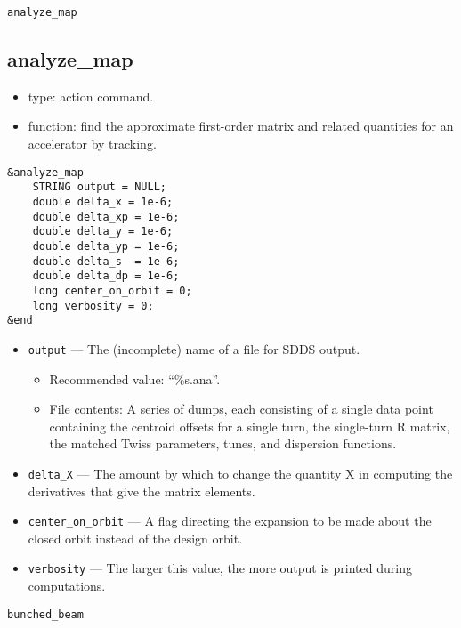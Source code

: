 \documentclass[11pt]{article}
\begin{document}
\begin{latexonly}
\newpage
\begin{center}{\Large \verb|analyze_map|}\end{center}
\end{latexonly}
\subsection{analyze\_map}

\begin{itemize}
\item type: action command.
\item function: find the approximate first-order matrix and related quantities for an accelerator by tracking.
\end{itemize}

\begin{verbatim}
&analyze_map
    STRING output = NULL;
    double delta_x = 1e-6;
    double delta_xp = 1e-6;
    double delta_y = 1e-6;
    double delta_yp = 1e-6;
    double delta_s  = 1e-6;
    double delta_dp = 1e-6;
    long center_on_orbit = 0;
    long verbosity = 0;
&end
\end{verbatim}

\begin{itemize}
\item \verb|output| --- The (incomplete) name of a file for SDDS output.
    \begin{itemize}
    \item Recommended value: ``\%s.ana''.
    \item File contents:  A series of dumps, each consisting of a single data point containing
        the centroid offsets for a single turn, the single-turn R matrix, the matched Twiss parameters, tunes, and 
        dispersion functions.
    \end{itemize}
\item \verb|delta_X| --- The amount by which to change the quantity X in computing the derivatives that give the matrix elements.
\item \verb|center_on_orbit| --- A flag directing the expansion to be made about the closed orbit instead of the design orbit.
\item \verb|verbosity| --- The larger this value, the more output is printed during computations.
\end{itemize}

\begin{latexonly}
\newpage
\begin{center}{\Large\verb|bunched_beam|}\end{center}
\end{latexonly}
\end{document}
